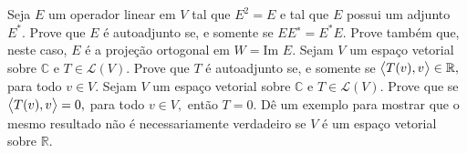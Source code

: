 \documentclass[11pt,a4paper]{article}
\begin{document}
  Seja $E$ um operador linear em $V$ tal que $E^2 = E$ e tal que $E$ possui um adjunto $E^{*}.$ Prove que $E$ é autoadjunto se, e somente se $EE^{∗} = E^{*}E.$ Prove também que, neste caso, $E$ é a projeção
ortogonal em $W = \mbox{Im }E.$
\solucao{}
 Sejam $V$ um espaço vetorial sobre $\mathbb{C}$ e $T \in \mathcal{L}(V).$ Prove que $T$ é autoadjunto se, e somente se $\left\langle T(v), v \right\rangle \in \mathbb{R},$ para todo $v \in V.$
 Sejam $V$ um espaço vetorial sobre $\mathbb{C}$ e $T \in \mathcal{L}(V).$ Prove que se $\left\langle T(v), v \right\rangle = 0,$ para todo $v \in V,$ então $T = 0.$ Dê um exemplo para mostrar que o mesmo resultado não é necessariamente
verdadeiro se $V$ é um espaço vetorial sobre $\mathbb{R}.$ 
\end{document}
